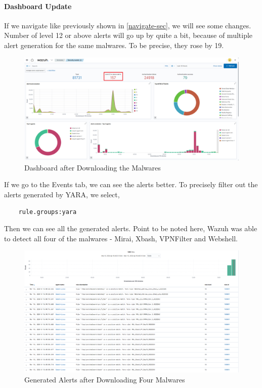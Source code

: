 \paragraph{Dashboard Update}
If we navigate like previously shown in \ref{navigate-sec}, we will see some changes. Number of level 12 or above alerts will go up by quite a bit, because of multiple alert generation for the same malwares. To be precise, they rose by 19. 
    \begin{figure}[H]
        \centering
        \includegraphics[width=\textwidth]{images/malware-detection/yara/6.png}
        \caption{Dashboard after Downloading the Malwares}
        \label{fig:yara-post-download}
    \end{figure}
If we go to the Events tab, we can see the alerts better. To precisely filter out the alerts generated by YARA, we select,
\begin{verbatim}
    rule.groups:yara
\end{verbatim}
Then we can see all the generated alerts. Point to be noted here, Wazuh was able to detect all four of the malwares - Mirai, Xbash, VPNFilter and Webshell.
    \begin{figure}[H]
        \centering
        \includegraphics[width=\textwidth]{images/malware-detection/yara/7.png}
        \caption{Generated Alerts after Downloading Four Malwares}
        \label{fig:yara-alerts}
    \end{figure}

